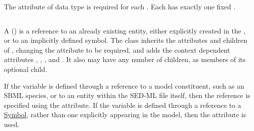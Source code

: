 \paragraph*{}
\label{sec:value}
The  attribute of data type  is required for each \Parameter. Each \Parameter has exactly one fixed .

\subsection{}
\label{class:variable}
A \Variable () is a reference to an already existing entity, either explicitly created in the \SedDocument, or to an implicitly defined symbol.  The \Variable class inherits the attributes and children of \SEDBase, changing the attribute  to be required, and adds the context dependent attributes \hyperref[sec:target]{}, \hyperref[sec:symbol]{}, \hyperref[sec:taskReferenceAttribute]{}, and \hyperref[sec:modelReferenceAttribute]{}. It also may have any number of \RemainingDimension children, as members of its \ListOfRemainingDimensions optional child.


If the variable is defined through a reference to a model constituent, such as an SBML species, or to an entity within the SED-ML file itself, then the reference is specified using the \hyperref[sec:target]{} attribute. If the variable is defined through a reference to a \hyperref[sec:implicitVariable]{Symbol}, rather than one explicitly appearing in the model, then the \hyperref[sec:symbol]{} attribute is used. 

